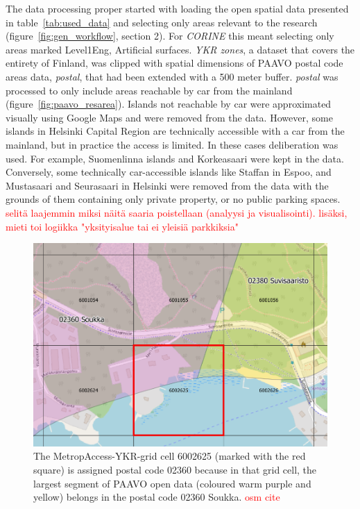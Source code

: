 The data processing proper started with loading the open spatial data presented in table~\ref{tab:used_data} and selecting only areas relevant to the research (figure~\ref{fig:gen_workflow}, section 2). For \textit{CORINE} this meant selecting only areas marked Level1Eng, Artificial surfaces. \textit{YKR zones}, a dataset that covers the entirety of Finland, was clipped with spatial dimensions of PAAVO postal code areas data, \textit{postal}, that had been extended with a 500 meter buffer. \textit{postal} was processed to only include areas reachable by car from the mainland (figure~\ref{fig:paavo_resarea}). Islands not reachable by car were approximated visually using Google Maps and were removed from the data. However, some islands in Helsinki Capital Region are technically accessible with a car from the mainland, but in practice the access is limited. In these cases deliberation was used. For example, Suomenlinna islands and Korkeasaari were kept in the data. Conversely, some technically car-accessible islands like Staffan in Espoo, and Mustasaari and Seurasaari in Helsinki were removed from the data with the grounds of them containing only private property, or no public parking spaces. \textcolor{red}{selitä laajemmin miksi näitä saaria poistellaan (analyysi ja visualisointi). lisäksi, mieti toi logiikka "yksityisalue tai ei yleisiä parkkiksia"}

\begin{figure}[H]%
    \includegraphics[width=\textwidth]{images/paavo-ykr.png}
    \caption[Assigning MetropAccess-YKR-grid postal codes]{The MetropAccess-YKR-grid cell 6002625 (marked with the red square) is assigned postal code 02360 because in that grid cell, the largest segment of PAAVO open data (coloured warm purple and yellow) belongs in the postal code 02360 Soukka. \textcolor{red}{osm cite}}%
    \label{fig:paavo_ykr}%
\end{figure}

